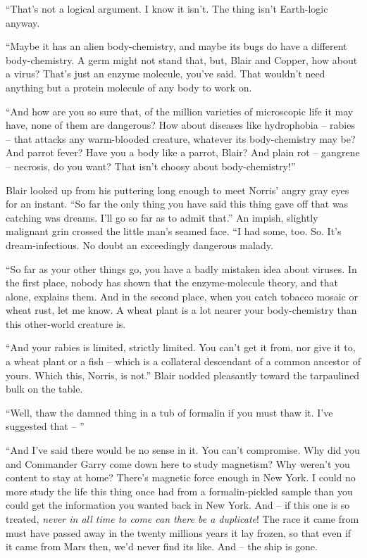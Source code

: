 \documentclass[ebook,oneside,11pt]{memoir}				%
\begin{document}
``That's not a logical argument. I know it isn't. The thing isn't Earth-logic anyway.

``Maybe it has an alien body-chemistry, and maybe its bugs do have a different body-chemistry. A germ might not stand that, but, Blair and Copper, how about a virus? That's just an enzyme molecule, you've said. That wouldn't need anything but a protein molecule of any body to work on.

``And how are you so sure that, of the million varieties of microscopic life it may have, none of them are dangerous? How about diseases like hydrophobia -- rabies -- that attacks any warm-blooded creature, whatever its body-chemistry may be? And parrot fever? Have you a body like a parrot, Blair? And plain rot -- gangrene -- necrosis, do you want? That isn't choosy about body-chemistry!''

Blair looked up from his puttering long enough to meet Norris' angry gray eyes for an instant. ``So far the only thing you have said this thing gave off that was catching was dreams. I'll go so far as to admit that.'' An impish, slightly malignant grin crossed the little man's seamed face. ``I had some, too. So. It's dream-infectious. No doubt an exceedingly dangerous malady.

``So far as your other things go, you have a badly mistaken idea about viruses. In the first place, nobody has shown that the enzyme-molecule theory, and that alone, explains them. And in the second place, when you catch tobacco mosaic or wheat rust, let me know. A wheat plant is a lot nearer your body-chemistry than this other-world creature is.

``And your rabies is limited, strictly limited. You can't get it from, nor give it to, a wheat plant or a fish -- which is a collateral descendant of a common ancestor of yours. Which this, Norris, is not.'' Blair nodded pleasantly toward the tarpaulined bulk on the table.

``Well, thaw the damned thing in a tub of formalin if you must thaw it. I've suggested that -- ''

``And I've said there would be no sense in it. You can't compromise. Why did you and Commander Garry come down here to study magnetism? Why weren't you content to stay at home? There's magnetic force enough in New York. I could no more study the life this thing once had from a formalin-pickled sample than you could get the information you wanted back in New York. And -- if this one is so treated, \emph{never in all time to come can there be a duplicate}! The race it came from must have passed away in the twenty millions years it lay frozen, so that even if it came from Mars then, we'd never find its like. And -- the ship is gone.
\end{document}

